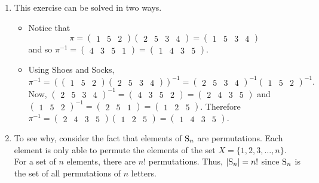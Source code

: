 \begin{enumerate}
    \item This exercise can be solved in two ways.
    \begin{itemize}
        \item Notice that
        \[
            \pi = \begin{pmatrix}1 & 5 & 2\end{pmatrix}\begin{pmatrix}2 & 5 & 3 & 4\end{pmatrix} =     \begin{pmatrix}1 & 5 & 3 & 4 \end{pmatrix}
        \]
        and so $\pi^{-1} = \begin{pmatrix}4 & 3 & 5 & 1\end{pmatrix} = \begin{pmatrix}1 & 4 & 3 & 5\end{pmatrix}$.
        \item Using Shoes and Socks,
        \[
            \pi^{-1} = \left(\begin{pmatrix}1 & 5 & 2\end{pmatrix}\begin{pmatrix}2 & 5 & 3 & 4\end{pmatrix}\right)^{-1} = \begin{pmatrix}2 & 5 & 3 & 4\end{pmatrix}^{-1} \begin{pmatrix}1 & 5 & 2\end{pmatrix}^{-1}.
        \]
        Now, $\begin{pmatrix}2 & 5 & 3 & 4\end{pmatrix}^{-1} = \begin{pmatrix}4 & 3 & 5 & 2\end{pmatrix} = \begin{pmatrix}2 & 4 & 3 & 5\end{pmatrix}$ and $\begin{pmatrix}1 & 5 & 2\end{pmatrix}^{-1} = \begin{pmatrix}2 & 5 & 1\end{pmatrix} = \begin{pmatrix}1 & 2 & 5\end{pmatrix}$. Therefore $\pi^{-1} = \begin{pmatrix}2 & 4 & 3 & 5\end{pmatrix}\begin{pmatrix}1 & 2 & 5\end{pmatrix} = \begin{pmatrix}1 & 4 & 3 & 5\end{pmatrix}$.
    \end{itemize}

    \item To see why, consider the fact that elements of $\mathrm{S}_{n}$ are permutations. Each element is only able to permute the elements of the set $X = \{1, 2, 3, \dots, n\}$. For a set of $n$ elements, there are $n!$ permutations. Thus, $|\mathrm{S}_{n}| = n!$ since $\mathrm{S}_{n}$ is the set of all permutations of $n$ letters.
\end{enumerate}

